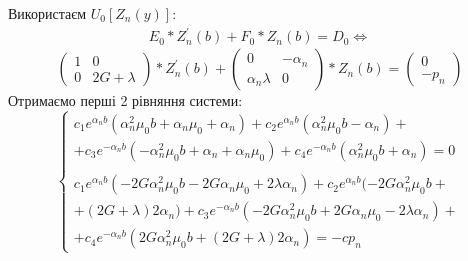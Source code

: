 \documentclass[a4paper,14pt]{extarticle}
\numberwithin{equation}{section}
\begin{document}
Використаєм $U_0\left[ Z_n(y) \right]$:
\begin{eqnarray*}
    E_0 * Z_n^{'}(b) + F_0 * Z_n(b) = D_0 \Leftrightarrow
\end{eqnarray*}
\begin{equation*}
    \begin{pmatrix}
        1 & 0 \\
        0 & 2G + \lambda
    \end{pmatrix} * Z_n^{'}(b) + \begin{pmatrix}
        0 & -\alpha_n \\
        \alpha_n \lambda & 0
    \end{pmatrix} * Z_n(b) = \begin{pmatrix}
        0 \\
        -p_n
    \end{pmatrix}
\end{equation*}
Отримаємо перші 2 рівняння системи:
\begin{equation*}
    \begin{cases}
        c_1 e^{\alpha_n b} (\alpha_n^2 \mu_0 b + \alpha_n \mu_0 + \alpha_n) + c_2 e^{\alpha_n b} (\alpha_n^2 \mu_0 b - \alpha_n) + \\
        + c_3 e^{-\alpha_n b} (-\alpha_n^2 \mu_0 b + \alpha_n + \alpha_n \mu_0) + c_4 e^{-\alpha_n b} (\alpha_n^2 \mu_0 b + \alpha_n) = 0 \\
        \\
        c_1 e^{\alpha_n b} (-2 G \alpha_n^2 \mu_0 b - 2 G \alpha_n \mu_0 + 2 \lambda \alpha_n) + c_2 e^{\alpha_n b} (-2G \alpha_n^2 \mu_0 b + \\
        + (2G + \lambda) 2 \alpha_n) + c_3  e^{-\alpha_n b} (-2 G \alpha_n^2 \mu_0 b + 2G \alpha_n \mu_0 - 2\lambda \alpha_n) + \\ 
        + c_4 e^{-\alpha_n b} (2G \alpha_n^2 \mu_0 b + (2G + \lambda) 2 \alpha_n) = -c p_n
    \end{cases}
\end{equation*}
\end{document}
